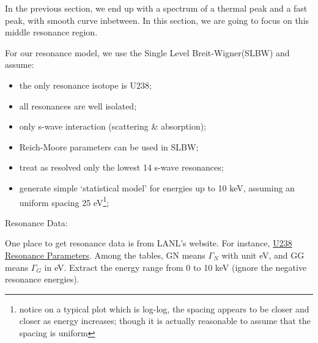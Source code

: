 \documentclass{school-22.211-notes}
\date{February 15, 2012}
\begin{document}
\maketitle

In the previous section, we end up with a spectrum of a thermal peak and a fast peak, with smooth curve inbetween. In this section, we are going to focus on this middle resonance region. 


For our resonance model, we use the Single Level Breit-Wigner(SLBW) and assume:
\begin{itemize}
  \item the only resonance isotope is U238;
  \item all resonances are well isolated;
  \item only s-wave interaction (scattering \& absorption);
  \item Reich-Moore parameters can be used in SLBW;
  \item treat as resolved only the lowest 14 s-wave resonances;
  \item generate simple `statistical model' for energies up to 10 keV, assuming an uniform spacing 25 eV\footnote{notice on a typical plot which is log-log, the spacing appears to be closer and closer as energy increases; though it is actually reasonable to assume that the spacing is uniform};
\end{itemize}

Resonance Data: 

One place to get resonance data is from LANL's website. For instance, \href{http://t2.lanl.gov/cgi-bin/endf?2,151,/inet/WWW/data/data/ENDFB-VII-neutron/U/238}{U238 Resonance Parameters}. Among the tables, GN means $\Gamma_N$ with unit eV, and GG means $\Gamma_G$ in eV. Extract the energy range from 0 to 10 keV (ignore the negative resonance energies). 
\end{document}
